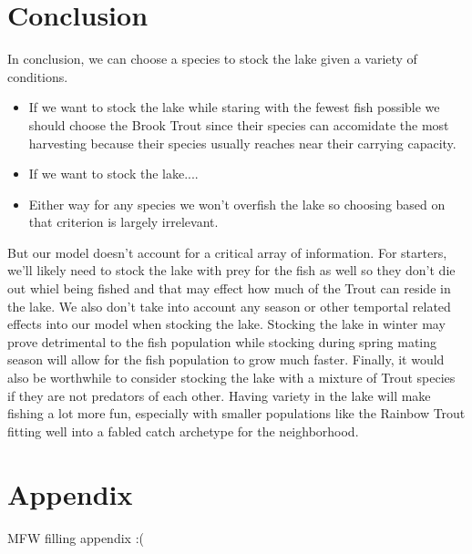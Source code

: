 \documentclass[letterpaper,12pt]{article}
\begin{document}
\section{Conclusion}
In conclusion, we can choose a species to stock the lake given a variety of conditions.
\begin{itemize}
    \item If we want to stock the lake while staring with the fewest fish possible we should choose the Brook Trout since their species can accomidate the most harvesting because their species usually reaches near their carrying capacity.
    \item If we want to stock the lake....
    \item Either way for any species we won't overfish the lake so choosing based on that criterion is largely irrelevant.
\end{itemize}
But our model doesn't account for a critical array of information. 
For starters, we'll likely need to stock the lake with prey for the fish as well so they don't die out whiel being fished and that may effect how much of the Trout can reside in the lake.
We also don't take into account any season or other temportal related effects into our model when stocking the lake.
Stocking the lake in winter may prove detrimental to the fish population while stocking during spring mating season will allow for the fish population to grow much faster.
Finally, it would also be worthwhile to consider stocking the lake with a mixture of Trout species if they are not predators of each other.
Having variety in the lake will make fishing a lot more fun, especially with smaller populations like the Rainbow Trout fitting well into a fabled catch archetype for the neighborhood.
\section{Appendix}
MFW filling appendix :(
\end{document}
